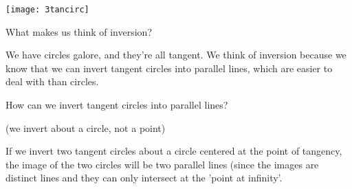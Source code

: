 \begin{center}
    \texttt{[image: 3tancirc]}    
\end{center}
What makes us think of inversion?








We have circles galore, and they're all tangent.  We think of inversion because we know that we can invert tangent circles into parallel lines, which are easier to deal with than circles.

How can we invert tangent circles into parallel lines?

(we invert about a circle, not a point)





If we invert two tangent circles about a circle centered at the point of tangency, the image of the two circles will be two parallel lines (since the images are distinct lines and they can only intersect at the 'point at infinity'.

